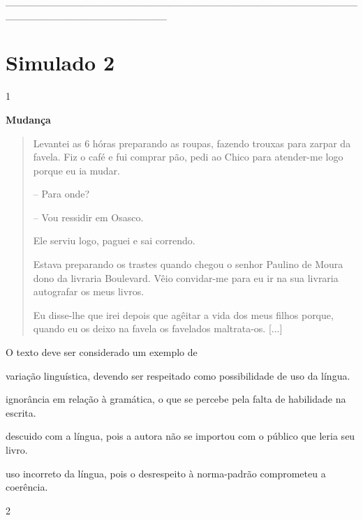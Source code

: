 \_\_\_\_\_\_\_\_\_\_\_\_\_\_\_\_\_\_\_\_\_\_\_\_\_\_\_\_\_\_\_\_\_\_\_\_\_\_\_\_\_\_\_\_\_\_\_\_\_\_\_\_\_\_\_\_\_\_\_\_\_\_\_\_\_\_\_\_\_\_

\section{Simulado 2}

\num{1}

\textbf{Mudança}

\begin{quote}
Levantei as 6 hóras preparando as roupas, fazendo trouxas para zarpar da
favela. Fiz o café e fui comprar pão, pedi ao Chico para atender-me logo
porque eu ia mudar.

-- Para onde?

-- Vou ressidir em Osasco.

Ele serviu logo, paguei e sai correndo.

Estava preparando os trastes quando chegou o senhor Paulino de Moura
dono da livraria Boulevard. Vêio convidar-me para eu ir na sua livraria
autografar os meus livros.

Eu disse-lhe que irei depois que agêitar a vida dos meus filhos porque,
quando eu os deixo na favela os favelados maltrata-os. {[}...{]}
\end{quote}


O texto deve ser considerado um exemplo de

\begin{escolha}
\item variação linguística, devendo ser respeitado como possibilidade de
uso da língua.

\item ignorância em relação à gramática, o que se percebe pela falta de
habilidade na escrita.

\item descuido com a língua, pois a autora não se importou com o público
que leria seu livro.

\item uso incorreto da língua, pois o desrespeito à norma-padrão
comprometeu a coerência.
\end{escolha}

\num{2}

